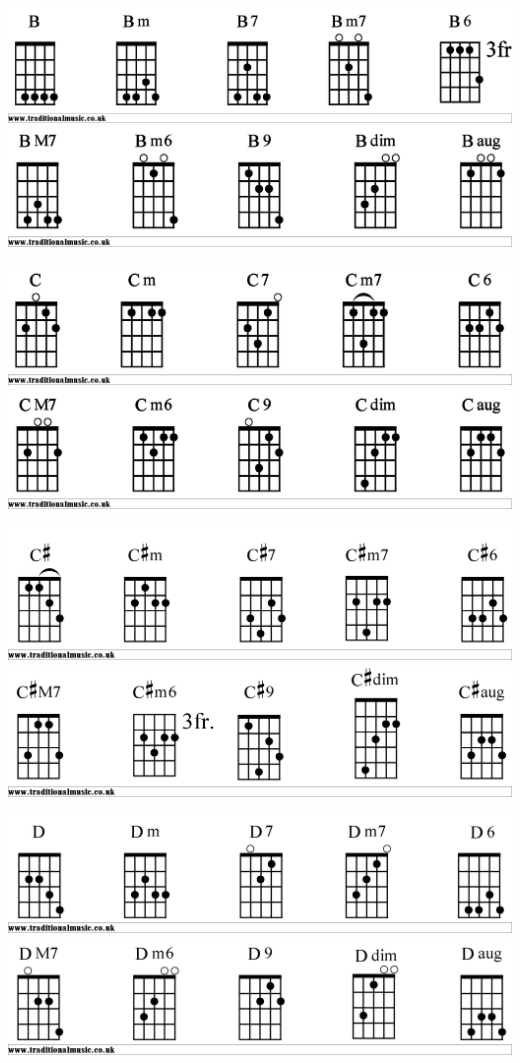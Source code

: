 \includegraphics[scale=.15]{chords/Bbjo1}
\includegraphics[scale=.15]{chords/Bbjo2}

\includegraphics[scale=.15]{chords/Cbjo1}
\includegraphics[scale=.15]{chords/Cbjo2}

\includegraphics[scale=.15]{chords/Csbjo1}
\includegraphics[scale=.15]{chords/Csbjo2}

\includegraphics[scale=.15]{chords/Dbjo1}
\includegraphics[scale=.15]{chords/Dbjo2}

